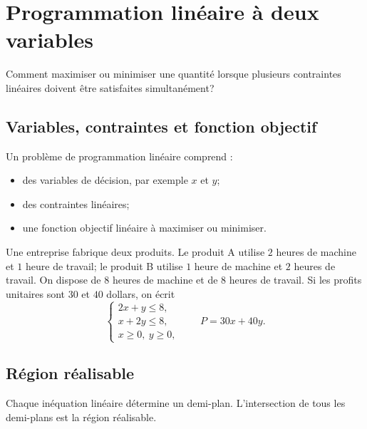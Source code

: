 \chapter{Programmation linéaire à deux variables}
\label{manual:chapter:13}

\begin{questionbox}
Comment maximiser ou minimiser une quantité lorsque plusieurs contraintes linéaires doivent être satisfaites simultanément?
\end{questionbox}

\section{Variables, contraintes et fonction objectif}
\label{manual:section:13.01}

Un problème de programmation linéaire comprend :
\begin{itemize}
\item des variables de décision, par exemple $x$ et $y$;
\item des contraintes linéaires;
\item une fonction objectif linéaire à maximiser ou minimiser.
\end{itemize}

\begin{examplebox}
Une entreprise fabrique deux produits. Le produit A utilise $2$ heures de machine et $1$ heure de travail; le produit B utilise $1$ heure de machine et $2$ heures de travail. On dispose de $8$ heures de machine et de $8$ heures de travail. Si les profits unitaires sont $30$ et $40$ dollars, on écrit
\[
\begin{cases}
2x+y\le8,\\
x+2y\le8,\\
x\ge0,\ y\ge0,
\end{cases}
\qquad
P=30x+40y.
\]
\end{examplebox}

\section{Région réalisable}
\label{manual:section:13.02}

Chaque inéquation linéaire détermine un demi-plan. L'intersection de tous les demi-plans est la région réalisable.

\begin{center}
\end{center}


